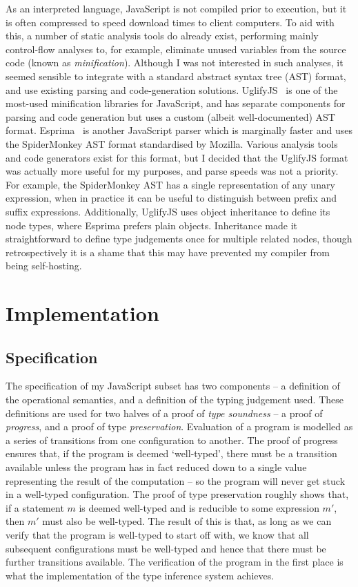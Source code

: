 \documentclass[12pt,a4paper,twoside,openright]{report}
\begin{document}
As an interpreted language, JavaScript is not compiled prior to execution, but
it is often compressed to speed download times to client computers. To aid with
this, a number of static analysis tools do already exist, performing mainly
control-flow analyses to, for example, eliminate unused variables from the
source code (known as \textit{minification}). Although I was not interested in
such analyses, it seemed sensible to integrate with a standard abstract syntax
tree (AST) format, and use existing parsing and code-generation solutions.
UglifyJS~\cite{uglify} is one of the most-used minification libraries for
JavaScript, and has separate components for parsing and code generation but
uses a custom (albeit well-documented) AST format. Esprima~\cite{esprima} is
another JavaScript parser which is marginally faster and uses the SpiderMonkey
AST format standardised by Mozilla. Various analysis tools and code generators
exist for this format, but I decided that the UglifyJS format was actually more
useful for my purposes, and parse speeds was not a priority. For example, the
SpiderMonkey AST has a single representation of any unary expression, when in
practice it can be useful to distinguish between prefix and suffix expressions.
Additionally, UglifyJS uses object inheritance to define its node types, where
Esprima prefers plain objects. Inheritance made it straightforward to define
type judgements once for multiple related nodes, though retrospectively it is a
shame that this may have prevented my compiler from being self-hosting.

\chapter{Implementation}\label{implementation}

\section{Specification}
The specification of my JavaScript subset has two components -- a definition of
the operational semantics, and a definition of the typing judgement used. These
definitions are used for two halves of a proof of \textit{type soundness} -- a
proof of \textit{progress}, and a proof of type \textit{preservation}.
Evaluation of a program is modelled as a series of transitions from one
configuration to another. The proof of progress ensures that, if the program is
deemed `well-typed', there must be a transition available unless the program
has in fact reduced down to a single value representing the result of the
computation -- so the program will never get stuck in a well-typed
configuration. The proof of type preservation roughly shows that, if a
statement $m$ is deemed well-typed and is reducible to some expression $m'$,
then $m'$ must also be well-typed. The result of this is that, as long as we
can verify that the program is well-typed to start off with, we know that all
subsequent configurations must be well-typed and hence that there must be
further transitions available. The verification of the program in the first
place is what the implementation of the type inference system achieves.
\end{document}
